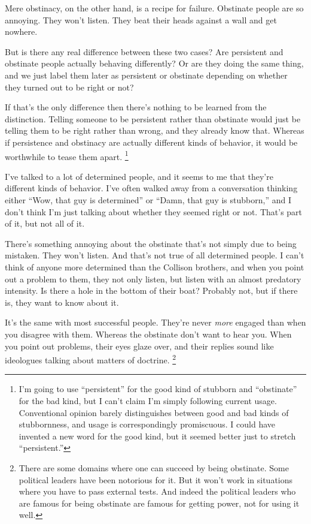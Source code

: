 \documentclass[12pt]{book}
\begin{document}
Mere obstinacy, on the other hand, is a recipe for failure. Obstinate
people are so annoying. They won't listen. They beat their heads against
a wall and get nowhere.

But is there any real difference between these two cases? Are persistent
and obstinate people actually behaving differently? Or are they doing
the same thing, and we just label them later as persistent or obstinate
depending on whether they turned out to be right or not?

If that's the only difference then there's nothing to be learned from
the distinction. Telling someone to be persistent rather than obstinate
would just be telling them to be right rather than wrong, and they
already know that. Whereas if persistence and obstinacy are actually
different kinds of behavior, it would be worthwhile to tease them apart.
\footnote{I'm going to use ``persistent'' for the good kind of stubborn
and ``obstinate'' for the bad kind, but I can't claim I'm simply
following current usage. Conventional opinion barely distinguishes
between good and bad kinds of stubbornness, and usage is correspondingly
promiscuous. I could have invented a new word for the good kind, but it
seemed better just to stretch ``persistent.''}

I've talked to a lot of determined people, and it seems to me that
they're different kinds of behavior. I've often walked away from a
conversation thinking either ``Wow, that guy is determined'' or ``Damn,
that guy is stubborn,'' and I don't think I'm just talking about whether
they seemed right or not. That's part of it, but not all of it.

There's something annoying about the obstinate that's not simply due to
being mistaken. They won't listen. And that's not true of all determined
people. I can't think of anyone more determined than the Collison
brothers, and when you point out a problem to them, they not only
listen, but listen with an almost predatory intensity. Is there a hole
in the bottom of their boat? Probably not, but if there is, they want to
know about it.

It's the same with most successful people. They're never \emph{more}
engaged than when you disagree with them. Whereas the obstinate don't
want to hear you. When you point out problems, their eyes glaze over,
and their replies sound like ideologues talking about matters of
doctrine. \footnote{There are some domains where one can succeed by being obstinate.
Some political leaders have been notorious for it. But it won't work in
situations where you have to pass external tests. And indeed the
political leaders who are famous for being obstinate are famous for
getting power, not for using it well.}
\end{document}
